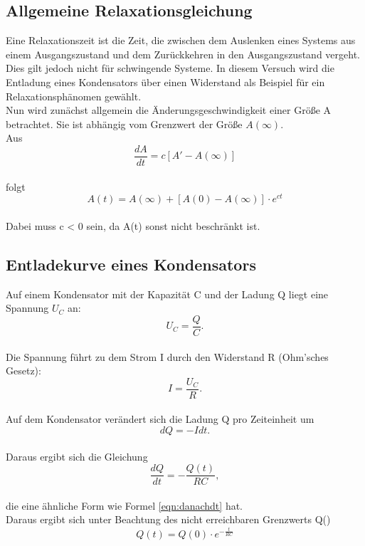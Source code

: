 \subsection{Allgemeine Relaxationsgleichung}

Eine Relaxationszeit ist die Zeit,
die zwischen dem Auslenken eines Systems aus einem Ausgangszustand und dem Zurückkehren in den Ausgangszustand vergeht.
Dies gilt jedoch nicht für schwingende Systeme.
In diesem Versuch wird die Entladung eines Kondensators über einen Widerstand als Beispiel für ein Relaxationsphänomen gewählt.
\\Nun wird zunächst allgemein die Änderungsgeschwindigkeit einer Größe A betrachtet.
Sie ist abhängig vom Grenzwert der Größe $A(\infty)$.
\\Aus
\begin{equation}
  \frac{dA}{dt} = c[A' - A(\infty)]
  \label{eqn:danachdt}
\end{equation}
\\folgt
\begin{equation}
  A(t) = A(\infty) + [A(0)-A(\infty)] \cdot e^{ct}
  \label{eqn:allrelax}
\end{equation}
\\Dabei muss c < 0 sein, da A(t) sonst nicht beschränkt ist.

\subsection{Entladekurve eines Kondensators}
Auf einem Kondensator mit der Kapazität C und der Ladung Q liegt eine Spannung $U_{C}$ an:
\begin{equation*}
  U_{C}= \frac{Q}{C}.
\end{equation*}
\\Die Spannung führt zu dem Strom I durch den Widerstand R (Ohm'sches Gesetz):
\begin{equation*}
  I = \frac{U_{C}}{R}.
\end{equation*}
\\Auf dem Kondensator verändert sich die Ladung Q pro Zeiteinheit um
\begin{equation*}
  dQ = -Idt.
\end{equation*}
\\Daraus ergibt sich die Gleichung
\begin{equation}
  \frac{dQ}{dt} = - \frac{Q(t)}{RC},
  \label{eqn:dgl1}
\end{equation}
\\die eine ähnliche Form wie Formel \eqref{eqn:danachdt} hat.
\\Daraus ergibt sich unter Beachtung des nicht erreichbaren Grenzwerts Q(\infty)
\begin{equation}
  Q(t)= Q(0) \cdot e^{-\frac{t}{RC}}
  \label{eqn:Entladekurve}
\end{equation}

